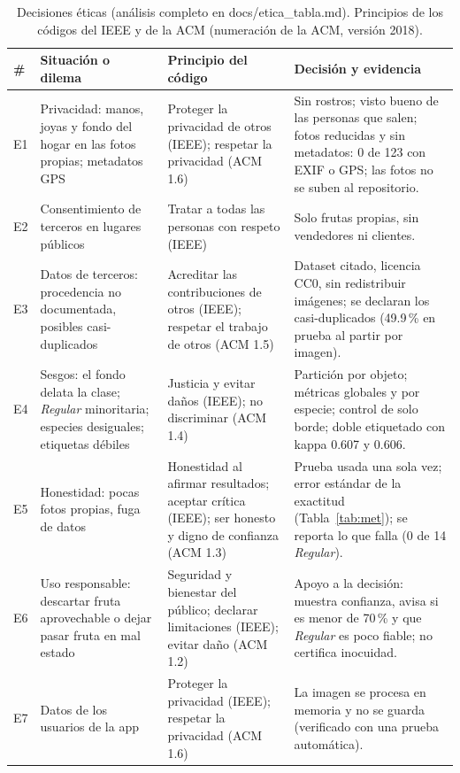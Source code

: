 \documentclass[conference]{IEEEtran}
\begin{document}
\begin{table}[t]
\centering
\caption{Decisiones \'eticas (an\'alisis completo en {\normalfont\ttfamily docs/etica\_tabla.md}). Principios de los c\'odigos del IEEE \cite{ieee_policy78} y de la ACM \cite{acm2018code} (numeraci\'on de la ACM, versi\'on 2018).}
\label{tab:etica}
\scriptsize
\begin{tabular}{@{}p{0.3cm}p{4.0cm}p{4.0cm}p{7.6cm}@{}}
\toprule
\# & Situaci\'on o dilema & Principio del c\'odigo & Decisi\'on y evidencia \\
\midrule
E1 & Privacidad: manos, joyas y fondo del hogar en las fotos propias; metadatos GPS & Proteger la privacidad de otros (IEEE); respetar la privacidad (ACM 1.6) & Sin rostros; visto bueno de las personas que salen; fotos reducidas y sin metadatos: 0 de 123 con EXIF o GPS; las fotos no se suben al repositorio. \\
E2 & Consentimiento de terceros en lugares p\'ublicos & Tratar a todas las personas con respeto (IEEE) & Solo frutas propias, sin vendedores ni clientes. \\
E3 & Datos de terceros: procedencia no documentada, posibles casi-duplicados & Acreditar las contribuciones de otros (IEEE); respetar el trabajo de otros (ACM 1.5) & Dataset citado, licencia CC0, sin redistribuir im\'agenes; se declaran los casi-duplicados (49.9\,\% en prueba al partir por imagen). \\
E4 & Sesgos: el fondo delata la clase; \emph{Regular} minoritaria; especies desiguales; etiquetas d\'ebiles & Justicia y evitar da\~nos (IEEE); no discriminar (ACM 1.4) & Partici\'on por objeto; m\'etricas globales y por especie; control de solo borde; doble etiquetado con kappa 0.607 y 0.606. \\
E5 & Honestidad: pocas fotos propias, fuga de datos & Honestidad al afirmar resultados; aceptar cr\'itica (IEEE); ser honesto y digno de confianza (ACM 1.3) & Prueba usada una sola vez; error est\'andar de la exactitud (Tabla~\ref{tab:met}); se reporta lo que falla (0 de 14 \emph{Regular}). \\
E6 & Uso responsable: descartar fruta aprovechable o dejar pasar fruta en mal estado & Seguridad y bienestar del p\'ublico; declarar limitaciones (IEEE); evitar da\~no (ACM 1.2) & Apoyo a la decisi\'on: muestra confianza, avisa si es menor de 70\,\% y que \emph{Regular} es poco fiable; no certifica inocuidad. \\
E7 & Datos de los usuarios de la app & Proteger la privacidad (IEEE); respetar la privacidad (ACM 1.6) & La imagen se procesa en memoria y no se guarda (verificado con una prueba autom\'atica). \\
\bottomrule
\end{tabular}
\end{table}
\end{document}
